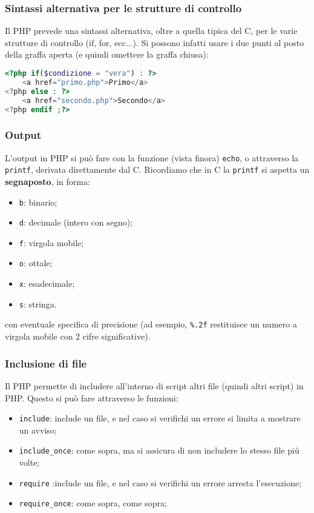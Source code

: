 \documentclass[a4paper,11pt]{article}
\begin{document}
\subsubsection{Sintassi alternativa per le strutture di controllo}
Il PHP prevede una sintassi alternativa, oltre a quella tipica del C, per le varie strutture di controllo (if, for, ecc...).
Si possono infatti usare i due punti al posto della graffa aperta (e quindi omettere la graffa chiusa):
\begin{lstlisting}[language=php, style=codestyle]	
<?php if($condizione = "vera") : ?>
	<a href="primo.php">Primo</a>
<?php else : ?>
	<a href="secondo.php">Secondo</a>
<?php endif ;?>
\end{lstlisting}

\subsubsection{Output}
L'output in PHP si può fare con la funzione (vista finora) \lstinline|echo|, o attraverso la \lstinline|printf|, derivata direttamente dal C.
Ricordiamo che in C la \lstinline|printf| si aspetta un \textbf{segnaposto}, in forma:
\begin{itemize}
	\item \lstinline|b|: binario;
	\item \lstinline|d|: decimale (intero con segno);
	\item \lstinline|f|: virgola mobile;
	\item \lstinline|o|: ottale;
	\item \lstinline|x|: esadecimale;
	\item \lstinline|s|: stringa.
\end{itemize}
con eventuale specifica di precisione (ad esempio, \lstinline|%.2f| restituisce un numero a virgola mobile con 2 cifre significative).

\subsubsection{Inclusione di file}
Il PHP permette di includere all'interno di script altri file (quindi altri script) in PHP.
Questo si può fare attraverso le funzioni:
\begin{itemize}
	\item \lstinline|include|: include un file, e nel caso si verifichi un errore si limita a mostrare un avviso;
	\item \lstinline|include_once|: come sopra, ma si assicura di non includere lo stesso file più volte;
	\item \lstinline|require| :include un file, e nel caso si verifichi un errore arresta l'esecuzione; 
	\item \lstinline|require_once|: come sopra, come sopra;
\end{itemize}
\end{document}
